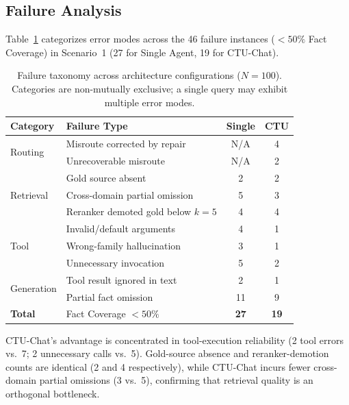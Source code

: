\subsection{Failure Analysis}
\label{sec:failure_analysis}

Table~\ref{tab:failures} categorizes error modes across the 46 failure instances ($<50\%$ Fact Coverage) in Scenario~1 (27 for Single Agent, 19 for CTU-Chat).

\begin{table}[!htbp]
\centering
\caption{Failure taxonomy across architecture configurations ($N=100$). Categories are non-mutually exclusive; a single query may exhibit multiple error modes.}
\label{tab:failures}
{\small
\begin{tabular}{llcc}
\toprule
\textbf{Category} & \textbf{Failure Type} & \textbf{Single} & \textbf{CTU} \\
\midrule
\multirow{2}{*}{Routing} & Misroute corrected by repair & N/A & 4 \\
 & Unrecoverable misroute & N/A & 2 \\
\midrule
\multirow{3}{*}{Retrieval} & Gold source absent & 2 & 2 \\
 & Cross-domain partial omission & 5 & 3 \\
 & Reranker demoted gold below $k{=}5$ & 4 & 4 \\
\midrule
\multirow{3}{*}{Tool} & Invalid/default arguments & 4 & 1 \\
 & Wrong-family hallucination & 3 & 1 \\
 & Unnecessary invocation & 5 & 2 \\
\midrule
\multirow{2}{*}{Generation} & Tool result ignored in text & 2 & 1 \\
 & Partial fact omission & 11 & 9 \\
\midrule
\textbf{Total} & Fact Coverage $<50\%$ & \textbf{27} & \textbf{19} \\
\bottomrule
\end{tabular}}
\end{table}

CTU-Chat's advantage is concentrated in tool-execution reliability (2 tool errors vs.\ 7; 2 unnecessary calls vs.\ 5). Gold-source absence and reranker-demotion counts are identical (2 and 4 respectively), while CTU-Chat incurs fewer cross-domain partial omissions (3 vs.\ 5), confirming that retrieval quality is an orthogonal bottleneck.

